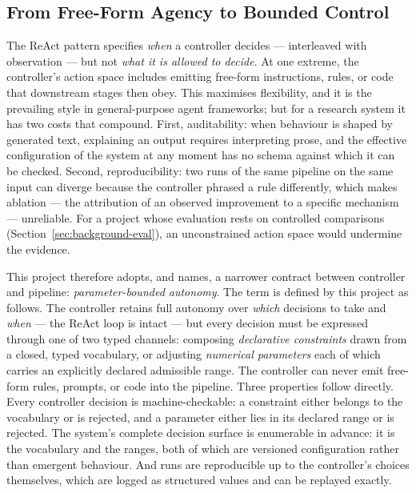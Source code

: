 \subsection{From Free-Form Agency to Bounded Control}
\label{sec:background-pba}

The ReAct pattern specifies \emph{when} a controller decides ---
interleaved with observation --- but not \emph{what it is allowed to
decide}. At one extreme, the controller's action space includes
emitting free-form instructions, rules, or code that downstream stages
then obey. This maximises flexibility, and it is the prevailing style
in general-purpose agent frameworks; but for a research system it has
two costs that compound. First, auditability: when behaviour is shaped
by generated text, explaining an output requires interpreting prose,
and the effective configuration of the system at any moment has no
schema against which it can be checked. Second, reproducibility: two
runs of the same pipeline on the same input can diverge because the
controller phrased a rule differently, which makes ablation --- the
attribution of an observed improvement to a specific mechanism ---
unreliable. For a project whose evaluation rests on controlled
comparisons (Section~\ref{sec:background-eval}), an unconstrained
action space would undermine the evidence.

This project therefore adopts, and names, a narrower contract between
controller and pipeline: \emph{parameter-bounded autonomy}. The term
is defined by this project as follows. The controller retains full
autonomy over \emph{which} decisions to take and \emph{when} --- the
ReAct loop is intact --- but every decision must be expressed through
one of two typed channels: composing \emph{declarative constraints}
drawn from a closed, typed vocabulary, or adjusting \emph{numerical
parameters} each of which carries an explicitly declared admissible
range. The controller can never emit free-form rules, prompts, or
code into the pipeline. Three properties follow directly. Every
controller decision is machine-checkable: a constraint either belongs
to the vocabulary or is rejected, and a parameter either lies in its
declared range or is rejected. The system's complete decision surface
is enumerable in advance: it is the vocabulary and the ranges, both of
which are versioned configuration rather than emergent behaviour. And
runs are reproducible up to the controller's choices themselves, which
are logged as structured values and can be replayed exactly.

